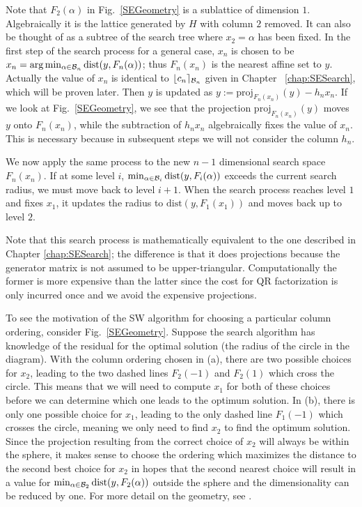 \documentclass[12pt,Bold,letterpaper]{mcgilletdclass}
\newcommand{\dist}{\mathrm{dist}}
\begin{document}
Note that $F_2(\alpha)$ in Fig.\ \ref{SEGeometry} is a sublattice of dimension $1$.  
Algebraically it is the lattice generated by $H$ with column
$2$ removed. It can also be thought of as a subtree of the search tree where
$x_2 = \alpha$ has been fixed. 
In the first step of the search process for a general case,   $x_n$ is chosen to be
 $x_n=\arg\min_{\alpha\in {\cal B}_n}\dist(y,F_n(\alpha))$; thus $F_n(x_n)$ is the nearest affine set to $y$. 
Actually the value of $x_n$ is identical to $\lfloor c_n \rceil_{{\cal B}_n}$ given in Chapter ~\ref{chap:SESearch},
which will be proven later.
Then   $y$ is updated  as $y := \mbox{proj}_{F_n(x_n)}(y) - h_nx_n$. If we look
at Fig.\ \ref{SEGeometry}, we see that the projection $\mbox{proj}_{F_n(x_n)}(y)$ moves $y$ onto $F_n(x_n)$, while the subtraction of $h_nx_n$ algebraically fixes the value of $x_n$. This is necessary because in subsequent steps we will not consider the column $h_n$.

We now apply the same process to the new $n-1$ dimensional search space
$F_n(x_n)$. If at some level $i$, $\min_{\alpha\in {\cal B}_i}\dist(y,F_i(\alpha))$ exceeds the current
search radius, we must move back to level $i+1$. %
When the search process reaches level $1$ and fixes $x_1$, it updates the radius to  
$\dist(y,F_1(x_1))$ and moves back up to level $2$.

Note that this search process is mathematically equivalent to the one described in Chapter
\ref{chap:SESearch}; the difference is that it  does projections
because  the generator matrix is not assumed to be upper-triangular. 
Computationally the former is more expensive than the latter since the cost for QR factorization is only incurred once and we avoid the expensive projections.

To see the motivation of the SW algorithm for choosing a particular column ordering,
consider Fig.\ \ref{SEGeometry}. Suppose the search algorithm has knowledge of
the residual for the optimal solution (the radius of the circle in the diagram).
With the column ordering chosen in (a), there are two possible choices for $x_2$,
leading to the two dashed lines $F_2(-1)$ and $F_2(1)$ which cross the circle. This means
that we will need to compute $x_1$ for both of these choices
before we can determine which one leads to the optimum solution. In (b), there
is only one possible choice for $x_1$,  leading to the only dashed line $F_1(-1)$
which crosses the circle, meaning we only need to find $x_2$ to find the optimum solution.
Since the projection resulting from the correct choice of $x_2$ will always be
within the sphere, it makes sense to choose the ordering which maximizes the
distance to the second best choice for $x_2$ in hopes that the second nearest
choice will result in a value for $\min_{\alpha\in {\cal B}_2}\dist(y,F_2(\alpha))$ outside the sphere and the
dimensionality can be reduced by one. 
For more detail on the geometry, see  \cite{SuW05}.
\end{document}
